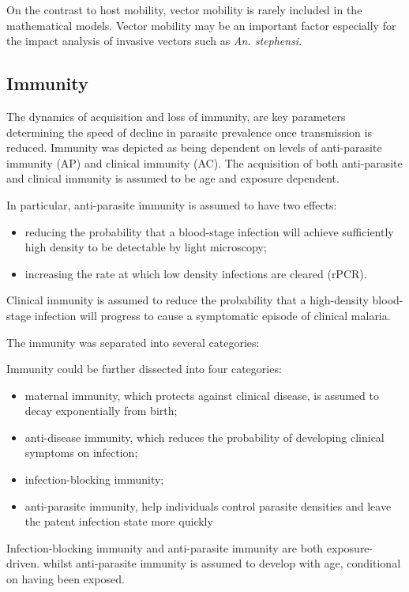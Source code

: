 \documentclass[a4paper, 12pt, twoside]{article}
\begin{document}
On the contrast to host mobility, vector mobility is rarely included in the mathematical models.
Vector mobility may be an important factor especially for the impact analysis of invasive vectors such as \textit{An. stephensi}.

\subsection{Immunity}
The dynamics of acquisition and loss of immunity, are key parameters determining the speed of decline in parasite prevalence once transmission is reduced.
Immunity was depicted as being dependent on levels of anti-parasite immunity (AP) and clinical immunity (AC).
The acquisition of both anti-parasite and clinical immunity is assumed to be age and exposure dependent.

In particular, anti-parasite immunity is assumed to have two effects:
\begin{itemize}
	\item reducing the probability that a blood-stage infection will achieve sufficiently high density to be detectable by light microscopy;
	\item increasing the rate at which low density infections are cleared (rPCR).
\end{itemize}
Clinical immunity is assumed to reduce the probability that a high-density blood-stage infection will progress to cause a symptomatic episode of clinical malaria.

The immunity was separated into several categories:

Immunity could be further dissected into four categories:
\begin{itemize}
	\item  maternal immunity, which protects against clinical disease, is assumed to decay exponentially from birth;
	\item  anti-disease immunity, which reduces the probability of developing clinical symptoms on infection;
	\item infection-blocking immunity;
	\item anti-parasite immunity, help individuals control parasite densities and leave the patent infection state more quickly
\end{itemize}
Infection-blocking immunity and anti-parasite immunity are both exposure-driven.
whilst anti-parasite immunity is assumed to develop with age, conditional on having been exposed.
\end{document}
